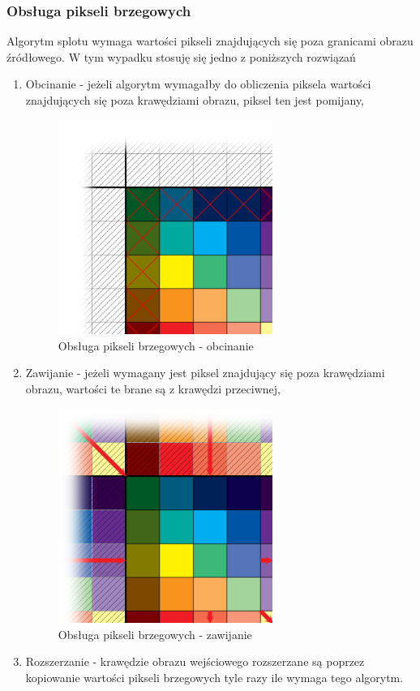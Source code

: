 \documentclass[twoside]{projektInzynierskiMS}
\begin{document}
\subsubsection{Obsługa pikseli brzegowych}
Algorytm splotu wymaga wartości pikseli znajdujących się poza granicami obrazu źródłowego. W tym wypadku stosuję się jedno z poniższych rozwiązań
\begin{enumerate}
	\item Obcinanie - jeżeli algorytm wymagałby do obliczenia piksela wartości znajdujących się poza krawędziami obrazu, piksel ten jest pomijany,
	\begin{figure}[h]
		\centering
		\includegraphics[width=7cm]{clipping.png}
		\caption{Obsługa pikseli brzegowych - obcinanie}
	\end{figure}
	\item Zawijanie - jeżeli wymagany jest piksel znajdujący się poza krawędziami obrazu, wartości te brane są z krawędzi przeciwnej,
	\newpage
	\begin{figure}[h]
		\centering
		\includegraphics[width=7cm]{wrapping.png}
		\caption{Obsługa pikseli brzegowych - zawijanie}
	\end{figure}
	\item Rozszerzanie - krawędzie obrazu wejściowego rozszerzane są poprzez kopiowanie wartości pikseli brzegowych tyle razy ile wymaga tego algorytm.

\end{enumerate}
\end{document}
